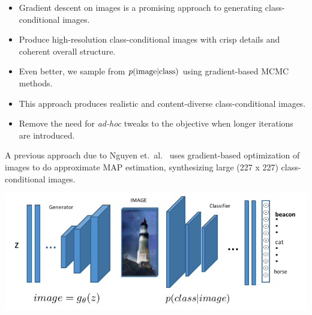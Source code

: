 \documentclass[landscape,a0b,final,a4resizeable]{include/a0poster}
\begin{document}
\begin{poster}
\begin{multicols}{3}
% 
%
% 
\vspace{0.2in}
% 
\begin{itemize}
	\item Gradient descent on images is a promising approach to generating class-conditional images.
	\item Produce high-resolution class-conditional images with crisp details and coherent overall structure.
	\item Even better, we sample from $p(\textnormal{image} | \textnormal{class})$ using gradient-based MCMC methods.
	\item This approach produces realistic and content-diverse class-conditional images.
	\item Remove the need for \emph{ad-hoc} tweaks to the objective when longer iterations are introduced.
\end{itemize}

\vspace{0.5in}

% 
A previous approach due to Nguyen et.\ al.\ \cite{Nguyen2016} uses gradient-based optimization of images to do approximate 
 MAP estimation, synthesizing large (227 x 227) class-conditional images.\\

\begin{center} 
  \centering
  \includegraphics{figures/img}
  \label{fig:net}
\end{center}


\end{multicols}
\end{poster}
\end{document}
